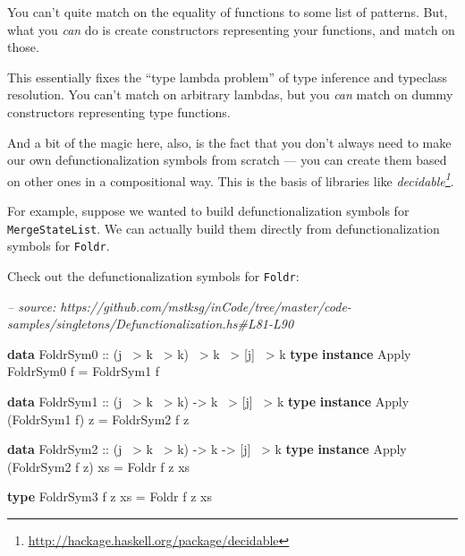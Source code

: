 \documentclass[]{article}
\newenvironment{Shaded}{}{}
\newcommand{\CommentTok}[1]{\textcolor[rgb]{0.38,0.63,0.69}{\textit{#1}}}
\newcommand{\DataTypeTok}[1]{\textcolor[rgb]{0.56,0.13,0.00}{#1}}
\newcommand{\FunctionTok}[1]{\textcolor[rgb]{0.02,0.16,0.49}{#1}}
\newcommand{\KeywordTok}[1]{\textcolor[rgb]{0.00,0.44,0.13}{\textbf{#1}}}
\newcommand{\NormalTok}[1]{#1}
\newcommand{\OtherTok}[1]{\textcolor[rgb]{0.00,0.44,0.13}{#1}}
\renewcommand{\href}[2]{#2\footnote{\url{#1}}}
\begin{document}
You can't quite match on the equality of functions to some list of patterns.
But, what you \emph{can} do is create constructors representing your functions,
and match on those.

This essentially fixes the ``type lambda problem'' of type inference and
typeclass resolution. You can't match on arbitrary lambdas, but you \emph{can}
match on dummy constructors representing type functions.

And a bit of the magic here, also, is the fact that you don't always need to
make our own defunctionalization symbols from scratch --- you can create them
based on other ones in a compositional way. This is the basis of libraries like
\emph{\href{http://hackage.haskell.org/package/decidable}{decidable}}.

For example, suppose we wanted to build defunctionalization symbols for
\texttt{MergeStateList}. We can actually build them directly from
defunctionalization symbols for \texttt{Foldr}.

Check out the defunctionalization symbols for \texttt{Foldr}:

\begin{Shaded}
\begin{Highlighting}[]
\CommentTok{-- source: https://github.com/mstksg/inCode/tree/master/code-samples/singletons/Defunctionalization.hs#L81-L90}

\KeywordTok{data} \DataTypeTok{FoldrSym0}\OtherTok{ ::}\NormalTok{ (j }\FunctionTok{~>}\NormalTok{ k }\FunctionTok{~>}\NormalTok{ k) }\FunctionTok{~>}\NormalTok{ k }\FunctionTok{~>}\NormalTok{ [j] }\FunctionTok{~>}\NormalTok{ k}
\KeywordTok{type} \KeywordTok{instance} \DataTypeTok{Apply} \DataTypeTok{FoldrSym0}\NormalTok{ f }\FunctionTok{=} \DataTypeTok{FoldrSym1}\NormalTok{ f}

\KeywordTok{data} \DataTypeTok{FoldrSym1}\OtherTok{ ::}\NormalTok{ (j }\FunctionTok{~>}\NormalTok{ k }\FunctionTok{~>}\NormalTok{ k) }\OtherTok{->}\NormalTok{ k }\FunctionTok{~>}\NormalTok{ [j] }\FunctionTok{~>}\NormalTok{ k}
\KeywordTok{type} \KeywordTok{instance} \DataTypeTok{Apply}\NormalTok{ (}\DataTypeTok{FoldrSym1}\NormalTok{ f) z }\FunctionTok{=} \DataTypeTok{FoldrSym2}\NormalTok{ f z}

\KeywordTok{data} \DataTypeTok{FoldrSym2}\OtherTok{ ::}\NormalTok{ (j }\FunctionTok{~>}\NormalTok{ k }\FunctionTok{~>}\NormalTok{ k) }\OtherTok{->}\NormalTok{ k }\OtherTok{->}\NormalTok{ [j] }\FunctionTok{~>}\NormalTok{ k}
\KeywordTok{type} \KeywordTok{instance} \DataTypeTok{Apply}\NormalTok{ (}\DataTypeTok{FoldrSym2}\NormalTok{ f z) xs }\FunctionTok{=} \DataTypeTok{Foldr}\NormalTok{ f z xs}

\KeywordTok{type} \DataTypeTok{FoldrSym3}\NormalTok{ f z xs }\FunctionTok{=} \DataTypeTok{Foldr}\NormalTok{ f z xs}
\end{Highlighting}
\end{Shaded}
\end{document}

